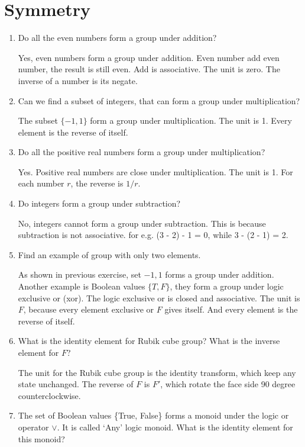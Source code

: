 \documentclass[UTF8]{article}
\begin{document}
\section{Symmetry}

\begin{enumerate}
\item {Do all the even numbers form a group under addition?}

Yes, even numbers form a group under addition. Even number add even number, the result is still even. Add is associative. The unit is zero. The inverse of a number is its negate.

\item {Can we find a subset of integers, that can form a group under multiplication?}

The subset $\{ -1, 1 \}$ form a group under multiplication. The unit is 1. Every element is the reverse of itself.

\item {Do all the positive real numbers form a group under multiplication?}

Yes. Positive real numbers are close under multiplication. The unit is 1. For each number $r$, the reverse is $1/r$.

\item {Do integers form a group under subtraction?}

No, integers cannot form a group under subtraction. This is because subtraction is not associative. for e.g. (3 - 2) - 1 = 0, while 3 - (2 - 1) = 2.

\item {Find an example of group with only two elements.}

As shown in previous exercise, set ${-1, 1}$ forms a group under addition. Another example is Boolean values $\{T, F\}$, they form a group under logic exclusive or (xor). The logic exclusive or is closed and associative. The unit is $F$, because every element exclusive or $F$ gives itself. And every element is the reverse of itself.

\item {What is the identity element for Rubik cube group? What is the inverse element for $F$?}

The unit for the Rubik cube group is the identity transform, which keep any state unchanged. The reverse of $F$ is $F'$, which rotate the face side 90 degree counterclockwise.

\item {The set of Boolean values \{True, False\} forms a monoid under the logic or operator $\lor$. It is called `Any' logic monoid. What is the identity element for this monoid?}


\end{enumerate}
\end{document}
